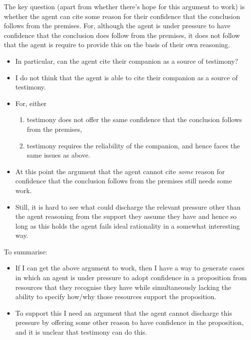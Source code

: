 \documentclass[10pt]{article}
\begin{document}
The key question (apart from whether there's hope for this argument to work) is whether the agent can cite some reason for their confidence that the conclusion follows from the premises.
For, although the agent is under pressure to have confidence that the conclusion does follow from the premises, it does not follow that the agent is require to provide this on the basis of their own reasoning.
\begin{itemize}
\item In particular, can the agent cite their companion as a source of testimony?
\end{itemize}

\begin{itemize}
\item I do not think that the agent is able to cite their companion as a source of testimony.
\item For, either
  \begin{enumerate}
  \item testimony does not offer the same confidence that the conclusion follows from the premises,
  \item testimony requires the reliability of the companion, and hence faces the same issues as above.
  \end{enumerate}
\item At this point the argument that the agent cannot cite \emph{some} reason for confidence that the conclusion follows from the premises still needs some work.
\item Still, it is hard to see what could discharge the relevant pressure other than the agent reasoning from the support they assume they have and hence so long as this holds the agent fails ideal rationality in a somewhat interesting way.
\end{itemize}

To summarise:

\begin{itemize}
\item If I can get the above argument to work, then I have a way to generate cases in which an agent is under pressure to adopt confidence in a proposition from resources that they recognise they have while simultaneously lacking the ability to specify how/why those resources support the proposition.
\item To support this I need an argument that the agent cannot discharge this pressure by offering some other reason to have confidence in the proposition, and it is unclear that testimony can do this.
\end{itemize}
\end{document}
